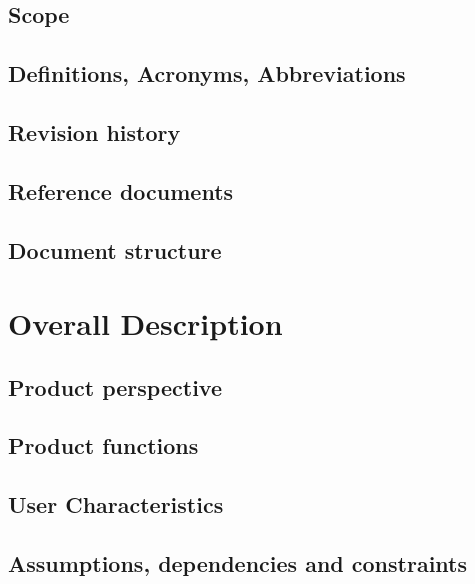 \documentclass[a4paper,oneside,11pt]{article}
\begin{document}
        \subsection{Scope}
            
        \subsection{Definitions, Acronyms, Abbreviations}
            
        \subsection{Revision history}
         
        \subsection{Reference documents}
            
        \subsection{Document structure}
        
        
    \newpage
    \section{Overall Description}
        \subsection{Product perspective}
            
        \subsection{Product functions}
            
        \subsection{User Characteristics}
            
        \subsection{Assumptions, dependencies and constraints}
            
\end{document}
